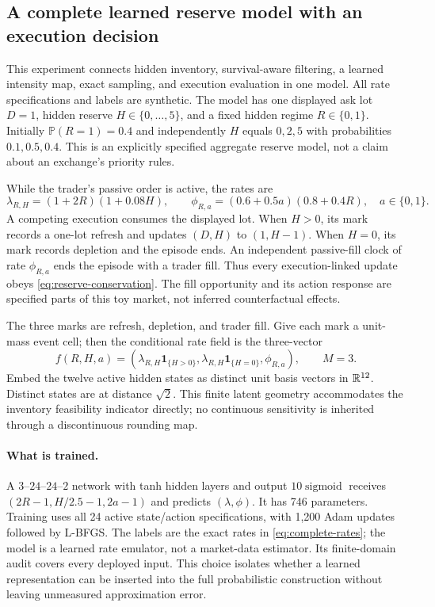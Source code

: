 \subsection{A complete learned reserve model with an execution decision}\label{sec:complete-model}
This experiment connects hidden inventory, survival-aware filtering, a learned intensity map, exact sampling, and execution evaluation in one model. All rate specifications and labels are synthetic. The model has one displayed ask lot $D=1$, hidden reserve $H\in\{0,\ldots,5\}$, and a fixed hidden regime $R\in\{0,1\}$. Initially $\mathbb P(R=1)=0.4$ and independently $H$ equals $0,2,5$ with probabilities $0.1,0.5,0.4$. This is an explicitly specified aggregate reserve model, not a claim about an exchange's priority rules.

While the trader's passive order is active, the rates are
\begin{equation}\label{eq:complete-rates}
 \lambda_{R,H}=(1+2R)(1+0.08H),\qquad
 \phi_{R,a}=(0.6+0.5a)(0.8+0.4R),\quad a\in\{0,1\}.
\end{equation}
A competing execution consumes the displayed lot. When $H>0$, its mark records a one-lot refresh and updates $(D,H)$ to $(1,H-1)$. When $H=0$, its mark records depletion and the episode ends. An independent passive-fill clock of rate $\phi_{R,a}$ ends the episode with a trader fill. Thus every execution-linked update obeys \eqref{eq:reserve-conservation}. The fill opportunity and its action response are specified parts of this toy market, not inferred counterfactual effects.

The three marks are refresh, depletion, and trader fill. Give each mark a unit-mass event cell; then the conditional rate field is the three-vector
\[
 f(R,H,a)=(\lambda_{R,H}\mathbf1_{\{H>0\}},
          \lambda_{R,H}\mathbf1_{\{H=0\}},\phi_{R,a}),\qquad M=3.
\]
Embed the twelve active hidden states as distinct unit basis vectors in $\mathbb R^{12}$. Distinct states are at distance $\sqrt2$. This finite latent geometry accommodates the inventory feasibility indicator directly; no continuous sensitivity is inherited through a discontinuous rounding map.

\paragraph{What is trained.}
A $3$--$24$--$24$--$2$ network with tanh hidden layers and output $10\operatorname{sigmoid}$ receives $(2R-1,H/2.5-1,2a-1)$ and predicts $(\lambda,\phi)$. It has 746 parameters. Training uses all 24 active state/action specifications, with 1,200 Adam updates followed by L-BFGS. The labels are the exact rates in \eqref{eq:complete-rates}; the model is a learned rate emulator, not a market-data estimator. Its finite-domain audit covers every deployed input. This choice isolates whether a learned representation can be inserted into the full probabilistic construction without leaving unmeasured approximation error.

